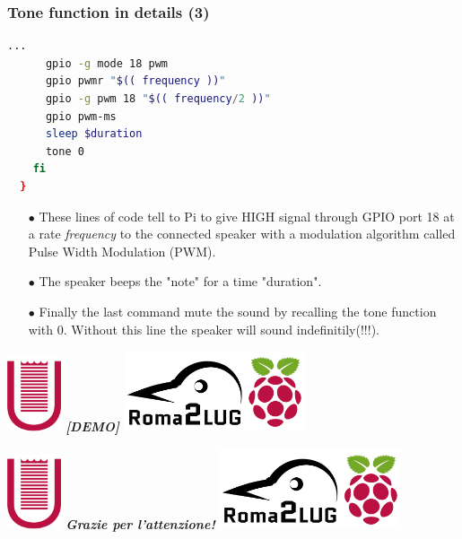 \documentclass{beamer}
\begin{document}
\begin{frame}[fragile]
	\frametitle{\textbf{Tone function in details (3)}}
  \begin{lstlisting}[language=bash]
      ...
      gpio -g mode 18 pwm
      gpio pwmr "$(( frequency ))"
      gpio -g pwm 18 "$(( frequency/2 ))"
      gpio pwm-ms
      sleep $duration
      tone 0
    fi
  }
  \end{lstlisting}
  \begin{itemize}
  \item[$\bullet$] These lines of code tell to Pi to give HIGH signal through GPIO port 18 at a rate \textit{frequency} to the connected speaker with a modulation algorithm called Pulse Width Modulation (PWM).
  \item[$\bullet$] The speaker beeps the "note" for a time "duration".
  \item[$\bullet$] Finally the last command mute the sound by recalling the tone function with 0. Without this line the speaker will sound indefinitily(!!!).
  \end{itemize}
\end{frame}



\begin{frame}[plain]
\begin{center}
\includegraphics[width=0.12\textwidth]{imgs/logo-uniroma2-red.png}
\vfill
\huge{\textit{\textbf{[DEMO]}}}
\vfill
\includegraphics[width=0.40\textwidth]{imgs/logo02.png}
\end{center}
\end{frame}



\begin{frame}[plain]
\begin{center}
\includegraphics[width=0.12\textwidth]{imgs/logo-uniroma2-red.png}
\vfill
\huge{\textit{\textbf{Grazie per l'attenzione!}}}
\vfill
\includegraphics[width=0.40\textwidth]{imgs/logo02.png}
\end{center}
\end{frame}
\end{document}

